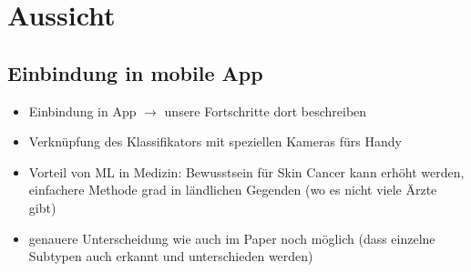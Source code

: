 \documentclass[a4paper, doc]{apa6}
\begin{document}
\section{Aussicht}
\subsection{Einbindung in mobile App}

\begin{itemize}
	\item Einbindung in App $\rightarrow$ unsere Fortschritte dort beschreiben
	\item Verknüpfung des Klassifikators mit speziellen Kameras fürs Handy
	\item Vorteil von ML in Medizin: Bewusstsein für Skin Cancer kann erhöht werden, einfachere Methode grad in ländlichen Gegenden (wo es nicht viele Ärzte gibt)
	\item genauere Unterscheidung wie auch im Paper noch möglich (dass einzelne Subtypen auch erkannt und unterschieden werden)
\end{itemize}




\end{document}
